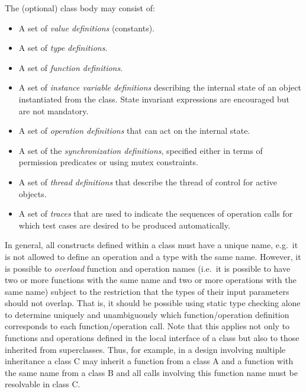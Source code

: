 \documentclass{overturerepchap}
\begin{document}
{\begin{description}
The (optional) class body may consist of:
\begin{itemize}
\item A set of {\it value definitions} (constants).
\item A set of {\it type definitions}.
\item A set of {\it function definitions}.
\item A set of {\it instance variable definitions} describing
  the internal state of an object instantiated from the
  class. State invariant expressions are encouraged but are not mandatory.
\item A set of {\it operation definitions} that can act on the internal state.
\item A set of the {\it synchronization definitions}, specified either
  in terms of permission predicates or using mutex constraints.
\item A set of {\it thread definitions} that describe the thread of control
  for active objects.
\item A set of {\it traces} that are used to indicate the sequences of
operation calls for which test cases are desired to be produced automatically.
\end{itemize}

In general, all constructs defined within a class must have a unique
name, e.g.\ it is not allowed to define an operation and a type with
the same name. However, it is possible to {\it overload} function and
operation names (i.e.\ it is possible to have two or more functions
with the same name and two or more operations with the same name)
subject to the restriction that the types of their input parameters
should not overlap. That is,  it should be possible using static type
checking alone to determine uniquely and unambiguously which
function/operation definition corresponds to each function/operation
call. Note that this applies not only to functions and operations
defined in the local interface of a class but also to those inherited
from superclasses. Thus, for example, in a design involving multiple
inheritance a class C may inherit a function from a class A and a
function with the same name from a class B and all calls involving
this function name must be resolvable in class C.
\end{description}

}
\end{document}
